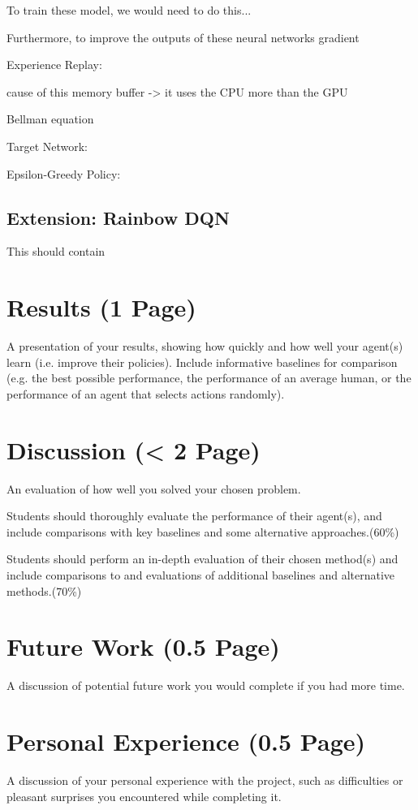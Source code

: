 \documentclass{article}
\begin{document}
To train these model, we would need to do this...


Furthermore, to improve the outputs of these neural networks gradient 

Experience Replay:

cause of this memory buffer -> it uses the CPU more than the GPU

Bellman equation 

Target Network:

Epsilon-Greedy Policy:



\subsection{Extension: Rainbow DQN}
This should contain 


\section{Results (1 Page)}
A presentation of your results, showing how quickly and how well your agent(s) learn (i.e. improve their policies). Include informative baselines for comparison (e.g. the best possible performance, the performance of an average human, or the performance of an agent that selects actions randomly).

\section{Discussion (< 2 Page)}
An evaluation of how well you solved your chosen problem.

Students should thoroughly evaluate the performance of their agent(s), and include comparisons with key baselines and some alternative approaches.(60\%)

Students should perform an in-depth evaluation of their chosen method(s) and include comparisons to and evaluations of additional baselines and alternative methods.(70\%)


\section{Future Work (0.5 Page)}
A discussion of potential future work you would complete if you had more
time.

\section{Personal Experience (0.5 Page)}
A discussion of your personal experience with the project, such as difficulties or pleasant surprises you encountered while completing it.
\end{document}
